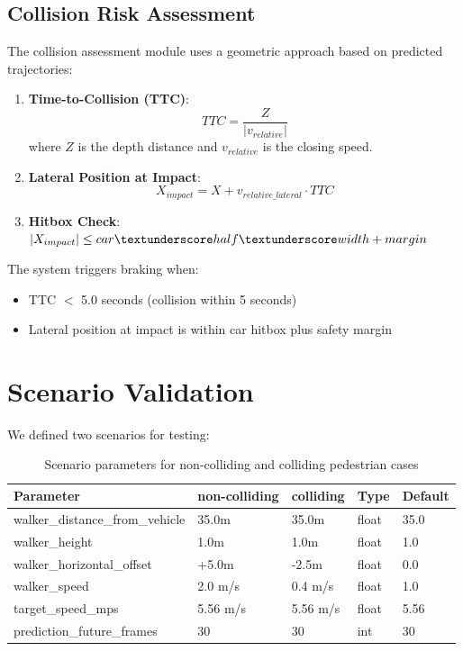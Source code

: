\subsection{Collision Risk Assessment}

The collision assessment module uses a geometric approach based on predicted trajectories:

\begin{enumerate}
    \item \textbf{Time-to-Collision (TTC)}:
    \begin{equation}
        TTC = \frac{Z}{|v_{relative}|}
    \end{equation}
    where $Z$ is the depth distance and $v_{relative}$ is the closing speed.
    
    \item \textbf{Lateral Position at Impact}:
    \begin{equation}
        X_{impact} = X + v_{relative\_lateral} \cdot TTC
    \end{equation}
    
    \item \textbf{Hitbox Check}:
    $ |X_{impact}| \leq car\textunderscore half\textunderscore width + margin$ 
\end{enumerate}

The system triggers braking when:
\begin{itemize}
    \item TTC $<$ 5.0 seconds (collision within 5 seconds)
    \item Lateral position at impact is within car hitbox plus safety margin
\end{itemize}

\section{Scenario Validation}

We defined two scenarios for testing:

\begin{table}[h]
    \centering
    \begin{tabular}{|l|l|l|l|l|}
        \hline
        Parameter & non-colliding & colliding & Type & Default \\
        \hline
        walker\_distance\_from\_vehicle & 35.0m & 35.0m & float & 35.0 \\
        \hline
        walker\_height & 1.0m & 1.0m & float & 1.0 \\
        \hline
        walker\_horizontal\_offset & +5.0m & -2.5m & float & 0.0 \\
        \hline
        walker\_speed & 2.0 m/s & 0.4 m/s & float & 1.0 \\
        \hline
        target\_speed\_mps & 5.56 m/s & 5.56 m/s & float & 5.56 \\
        \hline
        prediction\_future\_frames & 30 & 30 & int & 30 \\
        \hline
    \end{tabular}
    \caption{Scenario parameters for non-colliding and colliding pedestrian cases}
\end{table}

